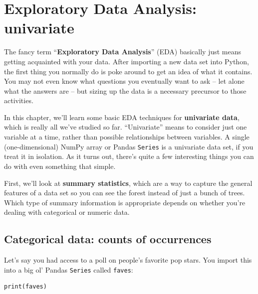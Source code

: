 
\chapter[EDA: univariate]{Exploratory Data Analysis: univariate}
\label{ch:edaUnivariate}


The fancy term ``\textbf{Exploratory Data Analysis}'' (EDA) basically just
means getting acquainted with your data. After importing a new data set into
Python, the first thing you normally do is poke around to get an idea of what
it contains. You may not even know what questions you eventually want to ask --
let alone what the answers are -- but sizing up the data is a necessary
precursor to those activities.


In this chapter, we'll learn some basic EDA techniques for \textbf{univariate
data}, which is really all we've studied so far. ``Univariate'' means to
consider just one variable at a time, rather than possible relationships
between variables. A single (one-dimensional) NumPy array or Pandas
\texttt{Series} is a univariate data set, if you treat it in isolation. As it
turns out, there's quite a few interesting things you can do with even
something that simple.



First, we'll look at \textbf{summary statistics}, which are a way to capture
the general features of a data set so you can see the forest instead of just a
bunch of trees. Which type of summary information is appropriate depends on
whether you're dealing with categorical or numeric data.

\section[Categorical: counts of occurrences]{Categorical data: counts of occurrences}

\label{categoricalDataValueCounts}


Let's say you had access to a poll on people's favorite pop stars. You import
this into a big ol' Pandas \texttt{Series} called \texttt{faves}:

\begin{Verbatim}[fontsize=\CBCodeSmall,samepage=true,frame=single,framesep=3mm]
print(faves)
\end{Verbatim}


